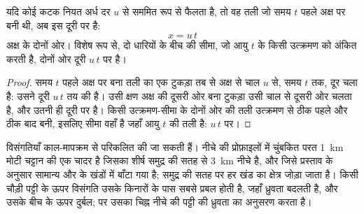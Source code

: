 \begin{proposition}[अक्ष से किसी धारी की दूरी]\label{prop:g11:drift-to-spreading:stripe}
यदि कोई कटक नियत अर्ध दर $u$ से सममित रूप से फैलता है, तो वह तली जो
समय $t$ पहले अक्ष पर बनी थी, अब इस दूरी पर है:
\[
  x = u\,t
\]
अक्ष के दोनों ओर। विशेष रूप से, दो धारियों के बीच की सीमा, जो
आयु $t$ के किसी उत्क्रमण को अंकित करती है, दोनों ओर दूरी $u\,t$ पर है।
\end{proposition}

\begin{proof}
समय $t$ पहले अक्ष पर बना तली का एक टुकड़ा तब से
अक्ष से चाल $u$ से, समय $t$ तक, दूर चला है: उसने दूरी
$u\,t$ तय की है। उसी क्षण अक्ष की दूसरी ओर बना टुकड़ा
उसी चाल से दूसरी ओर चलता है, और उतनी ही दूरी पर है। किसी उत्क्रमण-सीमा के
दोनों ओर की तली उत्क्रमण से ठीक पहले और ठीक बाद बनी,
इसलिए सीमा वहाँ है जहाँ आयु $t$ की तली है: $u\,t$ पर।
\end{proof}

विसंगतियाँ काल-मापक्रम से परिकलित की जा सकती हैं। नीचे की प्रोफ़ाइलों में
चुंबकित परत \qty{1}{km} मोटी चट्टान की एक चादर है जिसका शीर्ष
समुद्र की सतह से \qty{3}{km} नीचे है, और जिसे प्रस्ताव के अनुसार सामान्य और  के खंडों में बाँटा गया है; समुद्र की सतह पर हर खंड का क्षेत्र
जोड़ा जाता है। किसी चौड़ी पट्टी के ऊपर विसंगति उसके किनारों के पास सबसे प्रबल होती है, जहाँ
ध्रुवता बदलती है, और उसके बीच के ऊपर दुर्बल; पर उसका चिह्न नीचे की पट्टी की
ध्रुवता का अनुसरण करता है।


